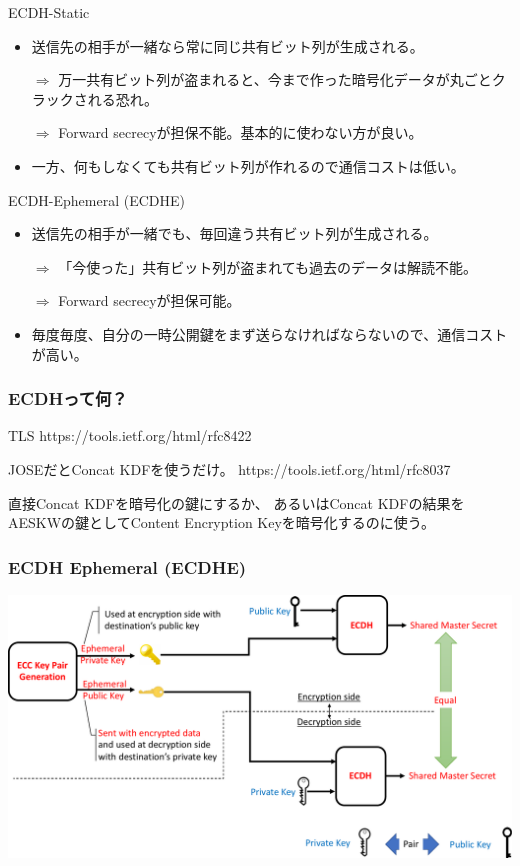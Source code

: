 \documentclass[12pt,dvipdfmx]{beamer}
\begin{document}
\begin{frame}
\small 
\begin{block}{\small ECDH-Static}
\end{block}

\begin{itemize}
 \item 送信先の相手が一緒なら常に同じ共有ビット列が生成される。

$\Rightarrow$ 万一共有ビット列が盗まれると、今まで作った暗号化データが丸ごとクラックされる恐れ。

$\Rightarrow$ \alert{Forward secrecyが担保不能}。基本的に使わない方が良い。
 \item 一方、何もしなくても共有ビット列が作れるので通信コストは低い。
\end{itemize}
\end{frame}


\begin{frame}
\small
\begin{block}{\small ECDH-Ephemeral (ECDHE)}
\end{block}

\begin{itemize}
 \item 送信先の相手が一緒でも、毎回違う共有ビット列が生成される。

$\Rightarrow$ 「今使った」共有ビット列が盗まれても過去のデータは解読不能。

$\Rightarrow$ \alert{Forward secrecyが担保可能}。
 \item 毎度毎度、自分の一時公開鍵をまず送らなければならないので、通信コストが高い。
\end{itemize}

\end{frame}


\begin{frame}
\frametitle{ECDHって何？}
TLS https://tools.ietf.org/html/rfc8422

JOSEだとConcat KDFを使うだけ。
https://tools.ietf.org/html/rfc8037

直接Concat KDFを暗号化の鍵にするか、
あるいはConcat KDFの結果をAESKWの鍵としてContent Encryption Keyを暗号化するのに使う。

\end{frame}

\begin{frame}
\frametitle{ECDH Ephemeral (ECDHE)}
\begin{center}
\includegraphics[width=\linewidth]{Figs/ecdh01.pdf}
\end{center}
\end{frame}
\end{document}
